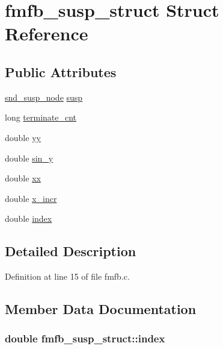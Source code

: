 \hypertarget{structfmfb__susp__struct}{}\section{fmfb\+\_\+susp\+\_\+struct Struct Reference}
\label{structfmfb__susp__struct}
\subsection*{Public Attributes}
\begin{DoxyCompactItemize}
\item 
\hyperlink{sound_8h_a6b268203688a934bd798ceb55f85d4c0}{snd\+\_\+susp\+\_\+node} \hyperlink{structfmfb__susp__struct_ae08e1b5d638165432cadfe62852ce0c0}{susp}
\item 
long \hyperlink{structfmfb__susp__struct_af4aeb64dd40322fb7e54190c19c44565}{terminate\+\_\+cnt}
\item 
double \hyperlink{structfmfb__susp__struct_a61011b949ed764b15134d4f5853758e3}{yy}
\item 
double \hyperlink{structfmfb__susp__struct_a49ab86b714007a45a7dedbea33121703}{sin\+\_\+y}
\item 
double \hyperlink{structfmfb__susp__struct_a7cf7919fb44b052c3b25ac12906da568}{xx}
\item 
double \hyperlink{structfmfb__susp__struct_ab8f9c6f9cef850571823ba6bdedf0272}{x\+\_\+incr}
\item 
double \hyperlink{structfmfb__susp__struct_acb8639a535fc8568825f72690de21d5e}{index}
\end{DoxyCompactItemize}


\subsection{Detailed Description}


Definition at line 15 of file fmfb.\+c.



\subsection{Member Data Documentation}
\subsubsection[{\texorpdfstring{index}{index}}]{\setlength{\rightskip}{0pt plus 5cm}double fmfb\+\_\+susp\+\_\+struct\+::index}\hypertarget{structfmfb__susp__struct_acb8639a535fc8568825f72690de21d5e}{}\label{structfmfb__susp__struct_acb8639a535fc8568825f72690de21d5e}


